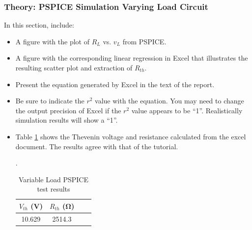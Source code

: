 \documentclass[11pt]{article}
\begin{document}
\subsubsection{Theory: PSPICE Simulation Varying Load Circuit}
 In this section, include: 
 \begin{itemize}
 	\item A figure with the plot of $R_L$ vs. $v_{L}$ from PSPICE.
 	\item A figure with the corresponding linear regression in Excel that illustrates the resulting scatter plot and extraction of $R_{th}$. 
 	\item Present the equation generated by Excel in the text of the report.
 	\item Be sure to indicate the $r^2$  value with the equation. You may need to change the output precision of Excel if the $r^2$ value appears to be ``1''.  Realistically simulation results will show a ``1''.
 	\item Table \ref{Table:Lab3VariableLoadPSPICE} shows the Thevenin voltage and resistance calculated from the excel document. The results agree with that of the tutorial.
 	\begin{table}[h]
 		\centering
 		\caption{Variable Load PSPICE test results}.
 		\label{Table:Lab3VariableLoadPSPICE}
 		\begin{tabular}{|c|c|c|c|}
 			\hline
 			$V_{th}$ (\si{\volt})& %
 			 $R_{th}$ (\si{\ohm}) \\
 			\hline
 			10.629	& 2514.3 \\	 \hline 
 		\end{tabular}
 	\end{table}
 \end{itemize}
 
\end{document}
